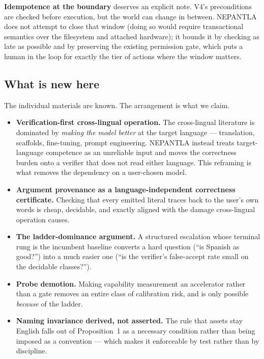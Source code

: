 \textbf{Idempotence at the boundary} deserves an explicit note. V4's
preconditions are checked before execution, but the world can change in between.
NEPANTLA does not attempt to close that window (doing so would require
transactional semantics over the filesystem and attached hardware); it bounds it
by checking as late as possible and by preserving the existing permission gate,
which puts a human in the loop for exactly the tier of actions where the window
matters.

\subsection{What is new here}
\label{sec:what-is-new}

The individual materials are known. The arrangement is what we claim.

\begin{itemize}
  \item \textbf{Verification-first cross-lingual operation.} The cross-lingual
        literature is dominated by \emph{making the model better} at the target
        language --- translation, scaffolds, fine-tuning, prompt engineering.
        NEPANTLA instead treats target-language competence as an unreliable
        input and moves the correctness burden onto a verifier that does not
        read either language. This reframing is what removes the dependency on a
        user-chosen model.
  \item \textbf{Argument provenance as a language-independent correctness
        certificate.} Checking that every emitted literal traces back to the
        user's own words is cheap, decidable, and exactly aligned with the
        damage cross-lingual operation causes.
  \item \textbf{The ladder-dominance argument.} A structured escalation whose
        terminal rung is the incumbent baseline converts a hard question
        (``is Spanish as good?'') into a much easier one (``is the verifier's
        false-accept rate small on the decidable classes?'').
  \item \textbf{Probe demotion.} Making capability measurement an accelerator
        rather than a gate removes an entire class of calibration risk, and is
        only possible \emph{because} of the ladder.
  \item \textbf{Naming invariance derived, not asserted.} The rule that assets
        stay English falls out of Proposition~1 as a necessary condition rather
        than being imposed as a convention --- which makes it enforceable by
        test rather than by discipline.
\end{itemize}
